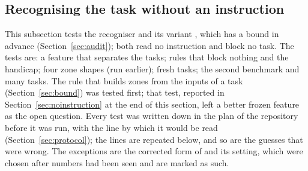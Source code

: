 \subsection{Recognising the task without an instruction}
\label{sec:recogniser}

This subsection tests the recogniser \recog{} and its variant \handicap{}, which has a bound in advance (Section~\ref{sec:audit}); both read no instruction and block no task. The tests are: a feature that separates the tasks; rules that block nothing and the handicap; four zone shapes (run earlier); fresh tasks; the second benchmark and many tasks. The rule that builds zones from the inputs of a task (Section~\ref{sec:bound}) was tested first; that test, reported in Section~\ref{sec:noinstruction} at the end of this section, left a better frozen feature as the open question.
Every test was written down in the plan of the repository before it was run, with the line by which it would be read (Section~\ref{sec:protocol}); the lines are repeated below, and so are the guesses that were wrong. The exceptions are the corrected form of \handicap{} and its setting, which were chosen after numbers had been seen and are marked as such.

